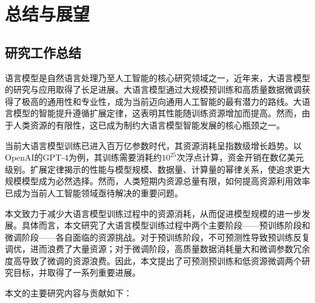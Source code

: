 \chapter{总结与展望}

\section{研究工作总结}

语言模型是自然语言处理乃至人工智能的核心研究领域之一，近年来，大语言模型的研究与应用取得了长足进展。大语言模型通过大规模预训练和高质量数据微调获得了极高的通用性和专业性，成为当前迈向通用人工智能的最有潜力的路线。大语言模型的智能提升遵循扩展定律，这表明其性能随训练资源增加而提高。然而，由于人类资源的有限性，这已成为制约大语言模型智能发展的核心瓶颈之一。

当前大语言模型训练已进入百万亿参数时代，其资源消耗呈指数级增长趋势。以OpenAI的GPT-4为例，其训练需要消耗约$10^25$次浮点计算，资金开销在数亿美元级别。扩展定律揭示的性能与模型规模、数据量、计算量的幂律关系，使追求更大规模模型成为必然选择。然而，人类短期内资源总量有限，如何提高资源利用效率已成为当前人工智能领域亟待解决的重要问题。

本文致力于减少大语言模型训练过程中的资源消耗，从而促进模型规模的进一步发展。具体而言，本文研究了大语言模型训练过程中两个主要阶段——预训练阶段和微调阶段——各自面临的资源挑战。对于预训练阶段，不可预测性导致预训练反复调优，进而浪费了大量资源；对于微调阶段，高质量数据消耗量大和微调参数冗余度高导致了微调的资源浪费。因此，本文提出了可预测预训练和低资源微调两个研究目标，并取得了一系列重要进展。

本文的主要研究内容与贡献如下：

